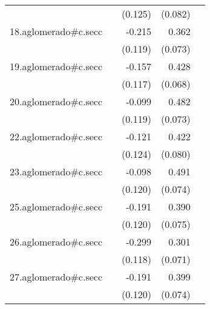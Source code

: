 {\begin{longtable}{l*{4}{D{.}{.}{-1}}}
            &                     &     (0.125)         &     (0.082)         &                     \\
\addlinespace
18.aglomerado#c.secc&                     &      -0.215         &       0.362\sym{***}&                     \\
            &                     &     (0.119)         &     (0.073)         &                     \\
\addlinespace
19.aglomerado#c.secc&                     &      -0.157         &       0.428\sym{***}&                     \\
            &                     &     (0.117)         &     (0.068)         &                     \\
\addlinespace
20.aglomerado#c.secc&                     &      -0.099         &       0.482\sym{***}&                     \\
            &                     &     (0.119)         &     (0.073)         &                     \\
\addlinespace
22.aglomerado#c.secc&                     &      -0.121         &       0.422\sym{***}&                     \\
            &                     &     (0.124)         &     (0.080)         &                     \\
\addlinespace
23.aglomerado#c.secc&                     &      -0.098         &       0.491\sym{***}&                     \\
            &                     &     (0.120)         &     (0.074)         &                     \\
\addlinespace
25.aglomerado#c.secc&                     &      -0.191         &       0.390\sym{***}&                     \\
            &                     &     (0.120)         &     (0.075)         &                     \\
\addlinespace
26.aglomerado#c.secc&                     &      -0.299\sym{*}  &       0.301\sym{***}&                     \\
            &                     &     (0.118)         &     (0.071)         &                     \\
\addlinespace
27.aglomerado#c.secc&                     &      -0.191         &       0.399\sym{***}&                     \\
            &                     &     (0.120)         &     (0.074)         &                     \\

\end{longtable}}
